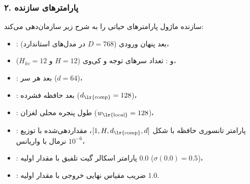 \subsubsection*{۲. پارامترهای سازنده }
سازنده ماژول  پارامترهای حیاتی را به شرح زیر سازمان‌دهی می‌کند:
\begin{itemize}
    \item {}: بعد پنهان ورودی ($D = 768$ در مدل‌های استاندارد)،
    \item {} و : تعداد سرهای توجه و کی‌وی ($H = 12$ و $H_{kv} = 12$)،
    \item {}: بعد هر سر ($d = 64$)،
    \item {}: بعد حافظه فشرده ($d_{\text{\lr{comp}}} = 128$)،
    \item {}: طول پنجره محلی لغزان ($w_{\text{\lr{local}}} = 128$)،
    \item {}: پارامتر تانسوری حافظه با شکل $[1, H, d_{\text{\lr{comp}}}, d]$، مقداردهی‌شده با توزیع نرمال با واریانس $10^{-6}$،
    \item {}: پارامتر اسکالر گیت تلفیق با مقدار اولیه $0.0$ ($\sigma(0.0) = 0.5$)،
    \item {}: ضریب مقیاس نهایی خروجی با مقدار اولیه $1.0$.
\end{itemize}

